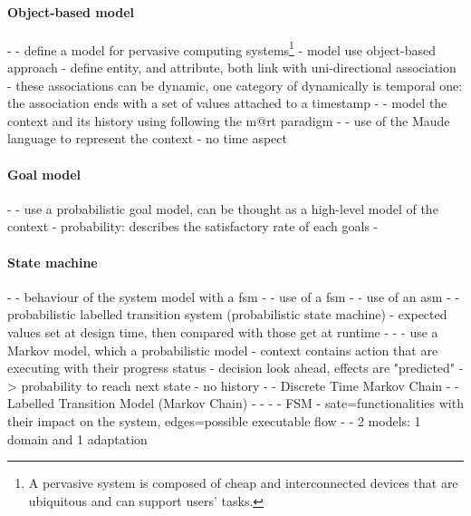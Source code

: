 \paragraph{Object-based model} %
- \cite{DBLP:conf/pervasive/HenricksenIR02}
	- define a model for pervasive computing systems\footnote{A pervasive system is composed of cheap and interconnected devices that are ubiquitous and can support users' tasks.\cite{DBLP:conf/pervasive/HenricksenIR02}}
	- model use object-based approach
	- define entity, and attribute, both link with uni-directional association
	- these associations can be dynamic, one category of dynamically is temporal one: the association ends with a set of values attached to a timestamp
- \cite{DBLP:conf/smartgridsec/0001FKNT14}
	- model the context and its history using following the \gls{m@rt} paradigm
- \cite{DBLP:conf/icse/TaharaOH17}
	- use of the Maude~\cite{DBLP:journals/tcs/ClavelDELMMQ02} language  to represent the context
	- no time aspect
	
	
\paragraph{Goal model} %
- \cite{DBLP:conf/icse/CailliauL17}
	- use a probabilistic goal model, can be thought as a high-level model of the context
		- probability: describes the satisfactory rate of each goals
- \cite{DBLP:conf/icse/IftikharW14a, DBLP:conf/icse/MendoncaAR14, DBLP:conf/icse/ChenPYNZ14}

\paragraph{State machine} %
- \cite{DBLP:conf/smartgridsec/0001FKNT14}
	- behaviour of the system model with a \gls{fsm}
- \cite{DBLP:conf/icse/IftikharW14a}
	- use of a \gls{fsm}
- \cite{DBLP:conf/icse/ArcainiRS15, DBLP:conf/rv/ArcainiGR11}
	- use of an \gls{asm}
- \cite{DBLP:conf/icse/BarbosaLMJ17}
	- probabilistic labelled transition system (probabilistic state machine) 
		- expected values set at design time, then compared with those get at runtime
- \cite{DBLP:journals/computing/BencomoBGBI13}
- \cite{DBLP:conf/sigsoft/MorenoCGS15}
	- use a Markov model, which a probabilistic model
	- context contains action that are executing with their progress status
	- decision look ahead, effects are "predicted" -> probability to reach next state
	- no history
- \cite{DBLP:conf/kbse/FilieriGLM11, DBLP:conf/dagstuhl/GhezziS10}
	- Discrete Time Markov Chain
- \cite{DBLP:conf/icse/DuarteMS18}
	- Labelled Transition Model (Markov Chain)
- \cite{DBLP:conf/wetice/DjoudiBZ14}
- \cite{DBLP:conf/aosd/ZhangGC09}
- \cite{DBLP:conf/icse/GhezziPST13}
	- FSM
	- sate=functionalities with their impact on the system, edges=possible executable flow
- \cite{DBLP:conf/kbse/TajalliGEM10}
	- 2 models: 1 domain and 1 adaptation

